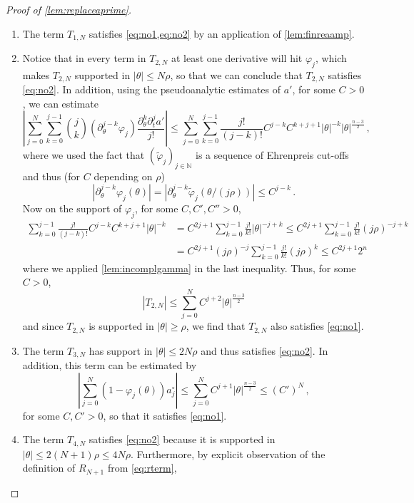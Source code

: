 \documentclass[
	fontsize=11pt, 
	twoside=false, 
	abstract=true, 
	a4paper,
]{scrartcl}
\newcommand{\abs}[1]{\left\lvert#1\right\rvert}
\newcommand{\del}{\partial}
\newcommand{\td}[1]{\tilde{#1}}
\begin{document}
\begin{proof}[Proof of \cref{lem:replaceaprime}]
		\begin{enumerate}[leftmargin=*]
		\item The term $T_{1,N}$ satisfies \cref{eq:no1,eq:no2} by an application of \cref{lem:finreaamp}.
		\item Notice that in every term in $T_{2,N}$ at least one derivative will hit $\varphi_{j}$, which makes $T_{2,N}$ supported in $\abs{\theta} \leq N\rho$, so that we can conclude that $T_{2,N}$ satisfies \cref{eq:no2}. In addition, using the pseudoanalytic estimates of $a'$, for some $C>0$, we can estimate
		\[
		\abs{\sum_{j=0}^N \sum_{k=0}^{j-1} {j\choose k}(\del_\theta^{j-k} \varphi_j)\frac{\del_\theta^k\del_t^j a'}{j!}} \leq \sum_{j=0}^{N}\sum_{k=0}^{j-1} \frac{j!}{(j-k)!} C^{j-k} C^{k+j+1} \abs{\theta}^{-k}\abs{\theta}^{\frac{n-3}{2}}\,,
		\]
		where we used the fact that $(\td{\varphi}_j)_{j\in\mathbb{N}}$ is a sequence of Ehrenpreis cut-offs and thus (for $C$ depending on $\rho$)%
		\[
			\abs{\del_\theta^{j-k} \varphi_{j}(\theta)} = \abs{\del_\theta^{j-k} \td{\varphi}_{j}(\theta/(j\rho))} \leq C^{j-k}\,.
		\]
		Now on the support of $\varphi_{j}$, for some $C,C',C''>0$,%
		\begin{align*}
\sum_{k=0}^{j-1} \frac{j!}{(j-k)!} C^{j-k} C^{k+j+1} \abs{\theta}^{-k} &= C^{2j+1}\sum_{k=0}^{j-1} \frac{j!}{k!}\abs{\theta}^{-j+k} \leq C^{2j+1}\sum_{k=0}^{j-1} \frac{j!}{k!} (j\rho)^{-j+k} \\
&= C^{2j+1}(j\rho)^{-j} \sum_{k=0}^{j-1}\frac{j!}{k!} (j\rho)^k \leq C^{2j+1}2^n %
		\end{align*}
		where we applied \cref{lem:incomplgamma} in the last inequality. Thus, for some $C>0$,
		\[
			      \abs{T_{2,N}} \leq \sum_{j=0}^N C^{j+2} \abs{\theta}^{\frac{n-3}{2}}
		\]
		and since $T_{2,N}$ is supported in $\abs{\theta}\geq \rho$, we find that $T_{2,N}$ also satisfies \cref{eq:no1}.
		\item The term $T_{3,N}$ has support in  $\abs{\theta}\leq 2N\rho$ and thus satisfies \cref{eq:no2}. In addition, this term can be estimated by 
		\[
		\abs{\sum_{j=0}^N (1-\varphi_j(\theta)) a^{\circ}_j} \leq \sum_{j=0}^N C^{j+1} \abs{\theta}^{\frac{n-3}{2}} \leq (C')^N\,,
		\]
		for some $C,C'>0$, so that it satisfies \cref{eq:no1}. 
		\item The term $T_{4,N}$ satisfies \cref{eq:no2} because it is supported in $\abs{\theta} \leq 2(N+1)\rho \leq 4N\rho$. Furthermore, by explicit observation of the definition of $R_{N+1}$ from \cref{eq:rterm},

\end{enumerate}
\end{proof}
\end{document}
